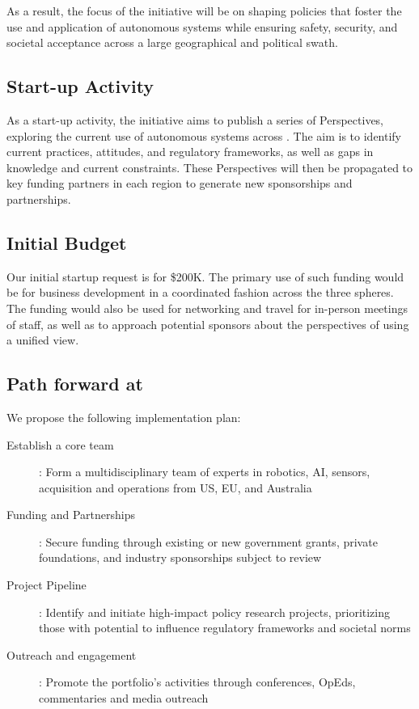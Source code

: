 \documentclass[11pt,letterpaper]{article}
\begin{document}
As a result, the focus of the initiative will be on shaping policies
that foster the use and application of autonomous systems while
ensuring safety, security, and societal acceptance across a large
geographical and political swath.


\subsection{Start-up Activity}
As a start-up activity, the initiative aims to publish a series of
Perspectives, exploring the current use of autonomous systems across
\auke. The aim is to identify current practices, attitudes, and
regulatory frameworks, as well as gaps in knowledge and current
constraints. These Perspectives will then be propagated to key funding
partners in each region to generate new sponsorships and partnerships.

\subsection{Initial Budget}

Our initial startup request is for \$200K. The primary use of such
funding would be for business development in a coordinated fashion
across the three spheres. The funding would also be used for
networking and travel for in-person meetings of \org staff, as well as
to approach potential sponsors about the perspectives of using a
unified view. 

\pagebreak

\subsection{Path forward at \org}

We propose the following implementation plan:

\begin{description}

\item[Establish a core team]: Form a multidisciplinary team of \org
  experts in robotics, AI, sensors, acquisition and operations from
  \org US, EU, and Australia

\item[Funding and Partnerships]: Secure funding through existing or
  new government grants, private foundations, and industry
  sponsorships subject to review

\item[Project Pipeline]: Identify and initiate high-impact policy
  research projects, prioritizing those with potential to influence
  regulatory frameworks and societal norms
  
\item[Outreach and engagement]: Promote the portfolio’s activities
  through conferences, OpEds, commentaries and media outreach


\end{description}
\end{document}
